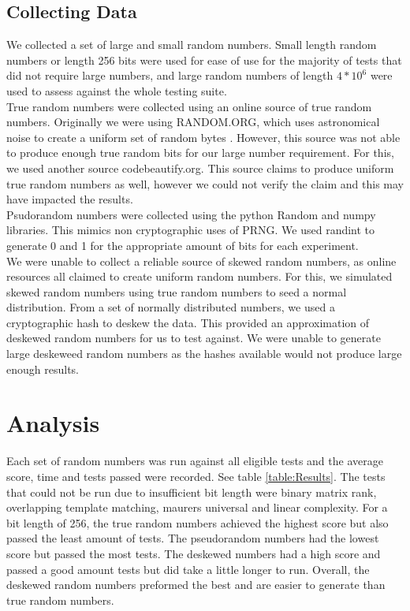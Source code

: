 \documentclass[11pt,letterpaper,conference]{IEEEtran}
\begin{document}
\subsection{Collecting Data}
We collected a set of large and small random numbers. Small length random numbers or length 256 bits were used for ease of use for the majority of tests that did not require large numbers, and large random numbers of length $4*10^6$ were used to assess against the whole testing suite.\\
True random numbers were collected using an online source of true random numbers. Originally we were using RANDOM.ORG, which uses astronomical noise to create a uniform set of random bytes \cite{RANDOM.ORG}. However, this source was not able to produce enough true random bits for our large number requirement. For this, we used another source codebeautify.org. This source claims to produce uniform true random numbers as well, however we could not verify the claim and this may have impacted the results.\\

Psudorandom numbers were collected using the python Random and numpy libraries. This mimics non cryptographic uses of PRNG. We used randint to generate 0 and 1 for the appropriate amount of bits for each experiment.\\

We were unable to collect a reliable source of skewed random numbers, as online resources all claimed to create uniform random numbers. For this, we simulated skewed random numbers using true random numbers to seed a normal distribution. From a set of normally distributed numbers, we used a cryptographic hash to deskew the data. This provided an approximation of deskewed random numbers for us to test against. We were unable to generate large deskeweed random numbers as the hashes available would not produce large enough results.

\section{Analysis}
Each set of random numbers was run against all eligible tests and the average score, time and tests passed were recorded. See table \ref{table:Results}.
The tests that could not be run due to insufficient bit length were binary matrix rank, overlapping template matching, maurers universal and linear complexity. For a bit length of 256, the true random numbers achieved the highest score but also passed the least amount of tests. The pseudorandom numbers had the lowest score but passed the most tests. The deskewed numbers had a high score and passed a good amount tests but did take a little longer to run. Overall, the deskewed random numbers preformed the best and are easier to generate than true random numbers.
\end{document}
